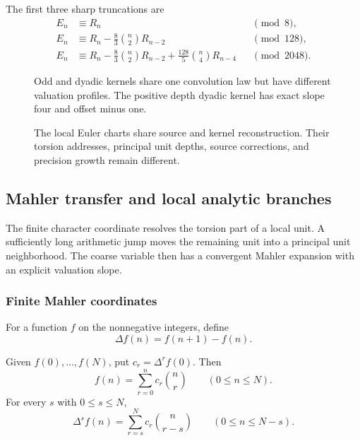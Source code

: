 The first three sharp truncations are
\[
\begin{aligned}
E_n&\equiv R_n&&\pmod 8,\\
E_n&\equiv R_n-\frac83\binom n2R_{n-2}&&\pmod {128},\\
E_n&\equiv R_n-\frac83\binom n2R_{n-2}
+\frac{128}{5}\binom n4R_{n-4}&&\pmod {2048}.
\end{aligned}
\]

\begin{figure}[t]
\centering
{}
\caption{Odd and dyadic kernels share one convolution law but have different valuation profiles. The positive depth dyadic kernel has exact slope four and offset minus one.}
\label{hist:fig:local_kernel_weights}
\end{figure}

\begin{figure}[t]
\centering
{}
\caption{The local Euler charts share source and kernel reconstruction. Their torsion addresses, principal unit depths, source corrections, and precision growth remain different.}
\label{hist:fig:odd_dyadic_geometry}
\end{figure}
\subsection{Mahler transfer and local analytic branches}\label{hist:sec:mahler}

The finite character coordinate resolves the torsion part of a local unit. A sufficiently long arithmetic jump moves the remaining unit into a principal unit neighborhood. The coarse variable then has a convergent Mahler expansion with an explicit valuation slope.

\subsubsection{Finite Mahler coordinates}

For a function \(f\) on the nonnegative integers, define
\[
\Delta f(n)=f(n+1)-f(n).
\]

\begin{histtheorem}\label{hist:thm:finite_mahler_unified}
Given \(f(0),\ldots,f(N)\), put \(c_r=\Delta^rf(0)\). Then
\[
\boxed{
f(n)=\sum_{r=0}^{n}c_r\binom nr
\qquad(0\leq n\leq N).
}
\]
For every \(s\) with \(0\leq s\leq N\),
\[
\boxed{
\Delta^sf(n)
=
\sum_{r=s}^{N}c_r\binom n{r-s}
\qquad(0\leq n\leq N-s).
}
\]
\end{histtheorem}

